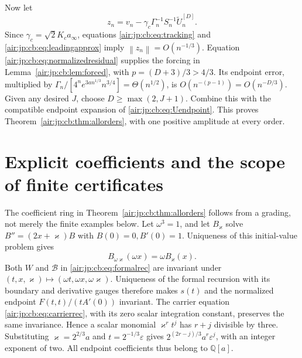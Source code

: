 \documentclass[11pt,letterpaper]{article}
\numberwithin{equation}{section}
\theoremstyle{remark}
\newcommand{\norm}[1]{\left\lVert#1\right\rVert}
\newcommand{\Q}{\mathbb{Q}}
\newcommand{\eps}{\varepsilon}
\begin{document}
Now let
\[
 z_n=v_n-\gamma_c\Gamma_n^{-1}S_n^{-1}\widetilde U_n^{[D]}.
\]
Since $\gamma_c=\sqrt2K_ca_\infty$, equations \eqref{air:jp:cb:eq:tracking} and \eqref{air:jp:cb:eq:leadingapprox} imply $\norm{z_n}=O(n^{-1/3})$. Equation \eqref{air:jp:cb:eq:normalizedresidual} supplies the forcing in Lemma~\ref{air:jp:cb:lem:forced}, with $p=(D+3)/3>4/3$. Its endpoint error, multiplied by $\Gamma_n/[4^ne^{3an^{1/3}}n^{3/4}]=\Theta(n^{1/2})$, is $O(n^{-(p-1)})=O(n^{-D/3})$. Given any desired $J$, choose $D\ge\max(2,J+1)$. Combine this with the compatible endpoint expansion of \eqref{air:jp:cb:eq:Uendpoint}. This proves Theorem~\ref{air:jp:cb:thm:allorders}, with one positive amplitude at every order.

\section{Explicit coefficients and the scope of finite certificates}\label{air:jp:cb:sec:coefficients}
The coefficient ring in Theorem~\ref{air:jp:cb:thm:allorders} follows from a grading, not merely the finite examples below. Let $\omega^3=1$, and let $B_{\varkappa}$ solve $B''=(2x+\varkappa)B$ with $B(0)=0,B'(0)=1$. Uniqueness of this initial-value problem gives
\[
 B_{\omega\varkappa}(\omega x)=\omega B_{\varkappa}(x).
\]
Both $W$ and $\mathcal B$ in \eqref{air:jp:cb:eq:formalrec} are invariant under $(t,x,\varkappa)\mapsto(\omega t,\omega x,\omega\varkappa)$. Uniqueness of the formal recursion with its boundary and derivative gauges therefore makes $s(t)$ and the normalized endpoint $F(t,t)/(tA'(0))$ invariant. The carrier equation \eqref{air:jp:cb:eq:carrierrec}, with its zero scalar integration constant, preserves the same invariance. Hence a scalar monomial $\varkappa^rt^j$ has $r+j$ divisible by three. Substituting $\varkappa=2^{2/3}a$ and $t=2^{-1/3}\eps$ gives $2^{(2r-j)/3}a^r\eps^j$, with an integer exponent of two. All endpoint coefficients thus belong to $\Q[a]$.
\end{document}

